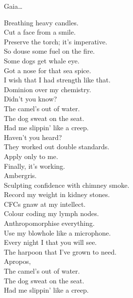 Gaia… \\




Breathing heavy candles. \\
Cut a face from a smile. \\
Preserve the torch; it's imperative. \\
So douse some fuel on the fire. \\

Some dogs get whale eye. \\
Got a nose for that sea spice. \\
I wish that I had strength like that. \\
Dominion over my chemistry. \\

Didn't you know? \\
The camel's out of water. \\
The dog sweat on the seat. \\
Had me slippin' like a creep. \\

Haven't you heard? \\
They worked out double standards. \\
Apply only to me. \\
Finally, it's working. \\
Ambergris. \\

Sculpting confidence with chimney smoke. \\
Record my weight in kidney stones. \\
CFCs gnaw at my intellect. \\
Colour coding my lymph nodes. \\

Anthropomorphise everything. \\
Use my blowhole like a microphone. \\
Every night I  that you will see. \\
The harpoon that I've grown to need. \\

Apropos, \\
The camel's out of water. \\
The dog sweat on the seat. \\
Had me slippin' like a creep. \\

